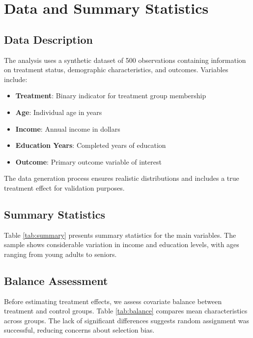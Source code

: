 \documentclass[11pt,letterpaper]{article}
\begin{document}
\section{Data and Summary Statistics}
\label{sec:data}

\subsection{Data Description}

The analysis uses a synthetic dataset of 500 observations containing information on treatment status, demographic characteristics, and outcomes. Variables include:

\begin{itemize}
    \item \textbf{Treatment}: Binary indicator for treatment group membership
    \item \textbf{Age}: Individual age in years
    \item \textbf{Income}: Annual income in dollars
    \item \textbf{Education Years}: Completed years of education
    \item \textbf{Outcome}: Primary outcome variable of interest
\end{itemize}

The data generation process ensures realistic distributions and includes a true treatment effect for validation purposes.

\subsection{Summary Statistics}

Table \ref{tab:summary} presents summary statistics for the main variables. The sample shows considerable variation in income and education levels, with ages ranging from young adults to seniors.



\subsection{Balance Assessment}

Before estimating treatment effects, we assess covariate balance between treatment and control groups. Table \ref{tab:balance} compares mean characteristics across groups. The lack of significant differences suggests random assignment was successful, reducing concerns about selection bias.
\end{document}
